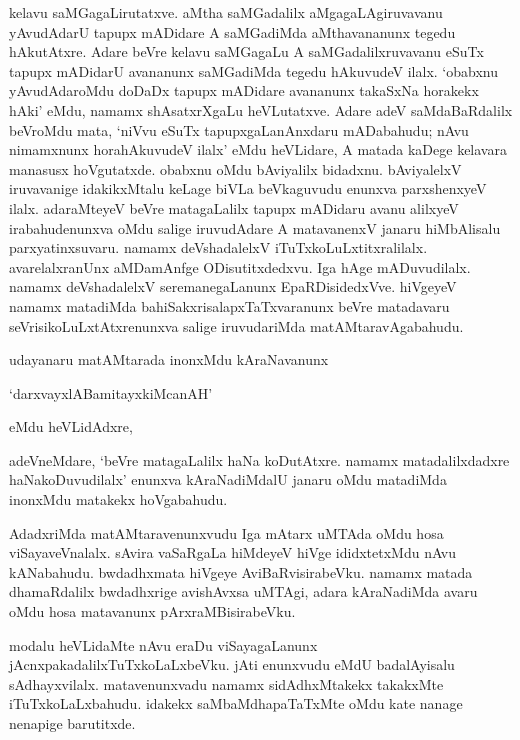 kelavu saMGagaLirutatxve. aMtha saMGadalilx aMgagaLAgiruvavanu yAvudAdarU tapupx mADidare A saMGadiMda aMthavananunx tegedu hAkutAtxre. Adare beVre kelavu saMGagaLu A saMGadalilxruvavanu eSuTx tapupx mADidarU avananunx saMGadiMda tegedu hAkuvudeV ilalx. `obabxnu yAvudAdaroMdu doDaDx tapupx mADidare avananunx takaSxNa horakekx hAki' eMdu, namamx shAsatxrXgaLu heVLutatxve. Adare adeV saMdaBaRdalilx beVroMdu mata, `niVvu eSuTx tapupxgaLanAnxdaru mADabahudu; nAvu nimamxnunx horahAkuvudeV ilalx' eMdu heVLidare, A matada kaDege kelavara manasusx hoVgutatxde. obabxnu oMdu bAviyalilx bidadxnu. bAviyalelxV iruvavanige idakikxMtalu keLage biVLa beVkaguvudu enunxva parxshenxyeV ilalx. adaraMteyeV beVre matagaLalilx tapupx mADidaru avanu alilxyeV irabahudenunxva oMdu salige iruvudAdare A matavanenxV janaru hiMbAlisalu parxyatinxsuvaru. namamx deVshadalelxV iTuTxkoLuLxtitxralilalx. avarelalxranUnx aMDamAnfge ODisutitxdedxvu. Iga hAge mADuvudilalx. namamx deVshadalelxV seremanegaLanunx EpaRDisidedxVve. hiVgeyeV namamx matadiMda 
bahiSakxrisalapxTaTxvaranunx beVre matadavaru seVrisikoLuLxtAtxrenunxva salige iruvudariMda matAMtaravAgabahudu.

udayanaru matAMtarada inonxMdu kAraNavanunx

`darxvayxlABamitayxkiMcanAH'

 eMdu heVLidAdxre,
 
adeVneMdare, `beVre matagaLalilx haNa koDutAtxre. namamx matadalilxdadxre haNakoDuvudilalx' enunxva kAraNadiMdalU janaru oMdu matadiMda inonxMdu matakekx hoVgabahudu.

AdadxriMda matAMtaravenunxvudu Iga mAtarx uMTAda oMdu hosa viSayaveVnalalx. sAvira vaSaRgaLa hiMdeyeV hiVge ididxtetxMdu nAvu kANabahudu. bwdadhxmata hiVgeye AviBaRvisirabeVku. namamx matada dhamaRdalilx bwdadhxrige avishAvxsa uMTAgi, adara kAraNadiMda avaru oMdu 
hosa matavanunx pArxraMBisirabeVku.

modalu heVLidaMte nAvu eraDu viSayagaLanunx jAcnxpakadalilxTuTxkoLaLxbeVku. jAti enunxvudu eMdU badalAyisalu sAdhayxvilalx. matavenunxvadu namamx sidAdhxMtakekx takakxMte iTuTxkoLaLxbahudu. idakekx saMbaMdhapaTaTxMte oMdu kate nanage nenapige barutitxde.

